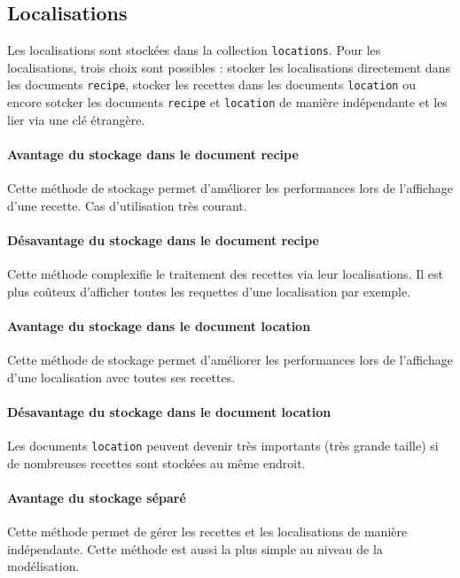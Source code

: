 	\subsection{Localisations}

		Les localisations sont stockées dans la collection \verb|locations|. Pour les localisations, trois choix sont possibles : stocker les localisations directement dans les documents \verb|recipe|, stocker les recettes dans les documents \verb|location| ou encore sotcker les documents \verb|recipe| et \verb|location| de manière indépendante et les lier via une clé étrangère.

		\paragraph{Avantage du stockage dans le document recipe}%
			Cette méthode de stockage permet d'améliorer les performances lors de l'affichage d'une recette. Cas d'utilisation très courant.

		\paragraph{Désavantage du stockage dans le document recipe}%
			Cette méthode complexifie le traitement des recettes via leur localisations. Il est plus coûteux d'afficher toutes les requettes d'une localisation par exemple.

		\paragraph{Avantage du stockage dans le document location}%
			Cette méthode de stockage permet d'améliorer les performances lors de l'affichage d'une localisation avec toutes ses recettes.

		\paragraph{Désavantage du stockage dans le document location}%
			Les documents \verb|location| peuvent devenir très importants (très grande taille) si de nombreuses recettes sont stockées au même endroit.

		\paragraph{Avantage du stockage séparé}%
			Cette méthode permet de gérer les recettes et les localisations de manière indépendante. Cette méthode est aussi la plus simple au niveau de la modélisation.

